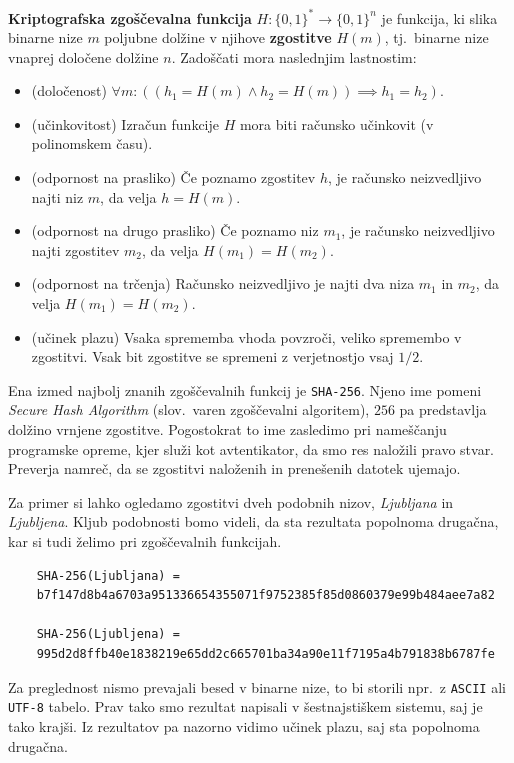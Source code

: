 \documentclass[isrm2, tisk]{fmfdelo}
\begin{document}
\begin{definicija} 
\label{def:hash}
    \textbf{Kriptografska zgoščevalna funkcija} $H: \{0, 1\}^* \rightarrow \{0, 1\}^n$ je funkcija, 
    ki slika binarne nize $m$ poljubne dolžine v njihove \textbf{zgostitve} $H(m)$, tj.\ binarne nize 
    vnaprej določene dolžine $n$. Zadoščati mora naslednjim lastnostim:
    \begin{itemize}
        \item (določenost) $\forall m: ((h_1 = H(m) \wedge h_2 = H(m)) \implies h_1 = h_2)$.
        \item (učinkovitost) Izračun funkcije $H$ mora biti računsko učinkovit (v polinomskem času).
        \item (odpornost na prasliko) Če poznamo zgostitev $h$, je računsko neizvedljivo najti 
            niz $m$, da velja $h = H(m)$.
        \item (odpornost na drugo prasliko) Če poznamo niz $m_1$, je računsko neizvedljivo najti 
            zgostitev $m_2$, da velja $H(m_1) = H(m_2)$.
        \item (odpornost na trčenja) Računsko neizvedljivo je najti dva niza $m_1$ in $m_2$, 
            da velja $H(m_1) = H(m_2)$.
        \item (učinek plazu) Vsaka sprememba vhoda povzroči, veliko spremembo v zgostitvi. 
            Vsak bit zgostitve se spremeni z verjetnostjo vsaj $1/2$.
    \end{itemize}
\end{definicija}

\begin{primer}
    Ena izmed najbolj znanih zgoščevalnih funkcij je \texttt{SHA-256}. Njeno ime pomeni \textit{Secure 
    Hash Algorithm} (slov.\ varen zgoščevalni algoritem), $256$ pa predstavlja dolžino vrnjene zgostitve. 
    Pogostokrat to ime zasledimo pri nameščanju programske opreme, kjer služi kot avtentikator, da smo res 
    naložili pravo stvar. Preverja namreč, da se zgostitvi naloženih in prenešenih datotek ujemajo.

    Za primer si lahko ogledamo zgostitvi dveh podobnih nizov, \textit{Ljubljana} in \textit{Ljubljena}. 
    Kljub podobnosti bomo videli, da sta rezultata popolnoma drugačna, kar si tudi želimo pri zgoščevalnih 
    funkcijah.
    \begin{verbatim}
    SHA-256(Ljubljana) =
    b7f147d8b4a6703a951336654355071f9752385f85d0860379e99b484aee7a82

    SHA-256(Ljubljena) =
    995d2d8ffb40e1838219e65dd2c665701ba34a90e11f7195a4b791838b6787fe
    \end{verbatim}
    Za preglednost nismo prevajali besed v binarne nize, to bi storili npr.\ z \texttt{ASCII} ali \texttt{UTF-8}
    tabelo. Prav tako smo rezultat napisali v šestnajstiškem sistemu, saj je tako krajši. Iz rezultatov
    pa nazorno vidimo učinek plazu, saj sta popolnoma drugačna.
\end{primer}
\end{document}
